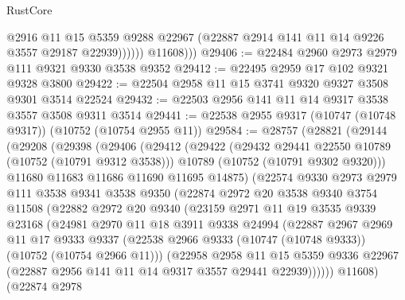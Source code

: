 \begin{lexlean}{RustCore}
\begin{coremodule}
                    @2916
                    @11
                    @15
                    @5359
                    @9288
                    @22967
                    (@22887 @2914 @141 @11 @14 @9226 @3557 @29187 @22939))))))
          @11608)))
@29406 := @22484 @2960 @2973 @2979 @111 @9321 @9330 @3538 @9352
@29412 := @22495 @2959 @17 @102 @9321 @9328 @3800
@29422 := @22504 @2958 @11 @15 @3741 @9320 @9327 @3508 @9301 @3514 @22524
@29432 := @22503 @2956 @141 @11 @14 @9317 @3538 @3557 @3508 @9311 @3514
@29441 := @22538 @2955 @9317 (@10747 (@10748 @9317)) (@10752 (@10754 @2955 @11))
@29584 := @28757
    (@28821
      (@29144
        (@29208
          (@29398
            (@29406
              (@29412
                (@29422
                  (@29432 @29441 @22550 @10789 (@10752 (@10791 @9312 @3538)))
                  @10789
                  (@10752 (@10791 @9302 @9320)))
                @11680
                @11683
                @11686
                @11690
                @11695
                @14875)
              (@22574
                @9330
                @2973
                @2979
                @111
                @3538
                @9341
                @3538
                @9350
                (@22874
                  @2972
                  @20
                  @3538
                  @9340
                  @3754
                  @11508
                  (@22882
                    @2972
                    @20
                    @9340
                    (@23159
                      @2971
                      @11
                      @19
                      @3535
                      @9339
                      @23168
                      (@24981
                        @2970
                        @11
                        @18
                        @3911
                        @9338
                        @24994
                        (@22887
                          @2967
                          @2969
                          @11
                          @17
                          @9333
                          @9337
                          (@22538 @2966 @9333 (@10747 (@10748 @9333)) (@10752 (@10754 @2966 @11)))
                          (@22958
                            @2958
                            @11
                            @15
                            @5359
                            @9336
                            @22967
                            (@22887 @2956 @141 @11 @14 @9317 @3557 @29441 @22939))))))
                  @11608)
                (@22874
                  @2978

\end{coremodule}
\end{lexlean}

